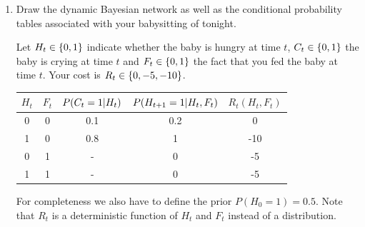 \documentclass[11pt, a4paper]{article}
\begin{document}
\begin{enumerate}
    \item Draw the dynamic Bayesian network as well as the conditional probability tables associated with your babysitting of tonight.

    \begin{solution}
        Let $H_t \in \{0, 1\}$ indicate whether the baby is hungry at time $t$, $C_t \in \{0, 1\}$ the baby is crying at time $t$ and $F_t \in \{0, 1\}$ the fact that you fed the baby at time $t$. Your cost is $R_t \in \{0, -5, -10\}$.

        \begin{figure}[h]
            \centering
        \end{figure}

        \begin{table}[h]
            \centering
            \begin{tabular}{cc|cc|c}
                \toprule
                $H_t$ & $F_t$ & $P(C_t = 1 \vert H_t)$ & $P(H_{t+1} = 1 \vert H_t, F_t)$ & $R_t(H_t, F_t)$ \\
                \midrule
                0 & 0 & 0.1 & 0.2 & 0 \\
                1 & 0 & 0.8 & 1 & -10 \\
                0 & 1 & -  & 0 & -5 \\
                1 & 1 & -  & 0 & -5 \\
                \bottomrule
            \end{tabular}
        \end{table}

        For completeness we also have to define the prior $P(H_0 = 1) = 0.5$. Note that $R_t$ is a deterministic function of $H_t$ and $F_t$ instead of a distribution.
    \end{solution}


\end{enumerate}
\end{document}
